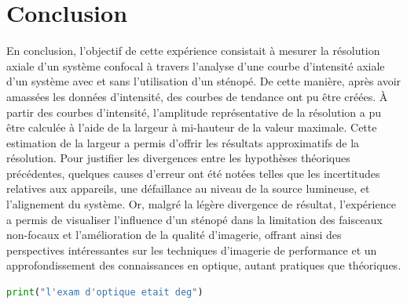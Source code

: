 \documentclass[11pt,letterpaper]{article}
\begin{document}




\section{Conclusion}
En conclusion, l'objectif de cette expérience consistait à mesurer la résolution axiale d'un système confocal à travers l'analyse d'une courbe d'intensité axiale d'un système avec et sans l'utilisation d'un sténopé. De cette manière, après avoir amassées les données d'intensité, des courbes de tendance ont pu être créées. À partir des courbes d'intensité, l'amplitude représentative de la résolution a pu être calculée à l'aide de la largeur à mi-hauteur de la valeur maximale. Cette estimation de la largeur a permis d'offrir les résultats approximatifs de la résolution. Pour justifier les divergences entre les hypothèses théoriques précédentes, quelques causes d'erreur ont été notées telles que les incertitudes relatives aux appareils, une défaillance au niveau de la source lumineuse, et l'alignement du système. Or, malgré la légère divergence de résultat, l'expérience a permis de visualiser l'influence d'un sténopé dans la limitation des faisceaux non-focaux et l'amélioration de la qualité d'imagerie, offrant ainsi des perspectives intéressantes sur les techniques d'imagerie de performance et un approfondissement des connaissances en optique, autant pratiques que théoriques.

\begin{lstlisting}[language=python]
print("l'exam d'optique etait deg")
\end{lstlisting}



\clearpage

% 
% 
\end{document}
